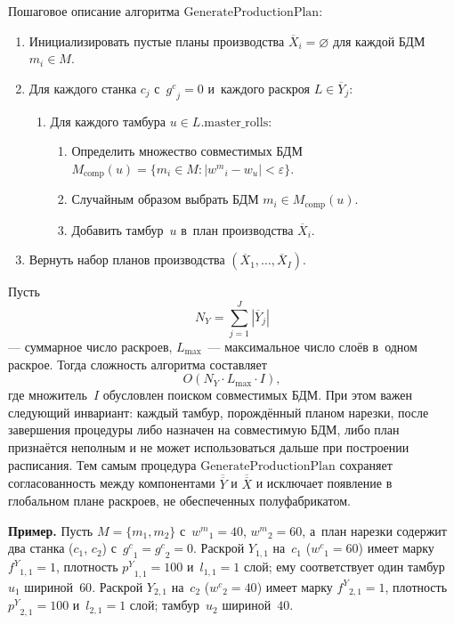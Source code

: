 Пошаговое описание алгоритма $\mathrm{GenerateProductionPlan}$:
\begin{enumerate}
  \item Инициализировать пустые планы производства $\overline{X}_i=\varnothing$ для каждой БДМ $m_i\in M$.
  \item Для каждого станка $c_j$ с~${g^c}_j=0$ и~каждого раскроя $L\in\overline{Y}_j$:
  \begin{enumerate}
    \item Для каждого тамбура $u\in L.\mathrm{master\_rolls}$:
    \begin{enumerate}
      \item Определить множество совместимых БДМ $M_{\mathrm{comp}}(u)=\{m_i\in M:|{w^m}_i-w_u|<\varepsilon\}$.
      \item Случайным образом выбрать БДМ $m_i\in M_{\mathrm{comp}}(u)$.
      \item Добавить тамбур~$u$ в~план производства $\overline{X}_i$.
    \end{enumerate}
  \end{enumerate}
  \item Вернуть набор планов производства $(\overline{X}_1,\ldots,\overline{X}_I)$.
\end{enumerate}

Пусть
\[
N_Y=\sum_{j=1}^{J}|\overline{Y}_j|
\]
--- суммарное число раскроев, $L_{\max}$~--- максимальное число слоёв в~одном раскрое.
Тогда сложность алгоритма составляет
\[
O(N_Y \cdot L_{\max} \cdot I),
\]
где множитель~$I$ обусловлен поиском совместимых БДМ.
При этом важен следующий инвариант: каждый тамбур, порождённый планом нарезки, после завершения процедуры либо назначен на совместимую БДМ, либо план признаётся неполным и не может использоваться дальше при построении расписания. Тем самым процедура $\mathrm{GenerateProductionPlan}$ сохраняет согласованность между компонентами $\overline{\overline{Y}}$ и $\overline{\overline{X}}$ и исключает появление в глобальном плане раскроев, не обеспеченных полуфабрикатом.

\textbf{Пример.}
Пусть $M=\{m_1,m_2\}$ с~${w^m}_1=40$, ${w^m}_2=60$, а~план нарезки содержит два станка ($c_1$, $c_2$) с~${g^c}_1={g^c}_2=0$.
Раскрой $Y_{1,1}$ на~$c_1$ (${w^c}_1=60$) имеет марку ${f^Y}_{1,1}=1$, плотность ${p^Y}_{1,1}=100$ и~$l_{1,1}=1$ слой; ему соответствует один тамбур $u_1$ шириной~$60$.
Раскрой $Y_{2,1}$ на~$c_2$ (${w^c}_2=40$) имеет марку ${f^Y}_{2,1}=1$, плотность ${p^Y}_{2,1}=100$ и~$l_{2,1}=1$ слой; тамбур~$u_2$ шириной~$40$.

